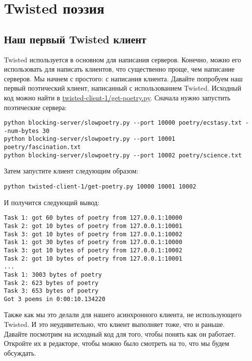 
\section{Twisted поэзия\label{sec:part4}}

\subsection{Наш первый Twisted клиент}

Twisted используется в основном для написания серверов. 
Конечно, можно его использовать для написать клиентов, 
что существенно проще, чем написание серверов. Мы начнем с 
простого: с написания клиента. 
Давайте попробуем наш первый поэтический клиент, 
написанный с использованием Twisted. Исходный код  
можно найти в 
\href{http://github.com/jdavisp3/twisted-intro/blob/master/twisted-client-1/get-poetry.py}{twisted-client-1/get-poetry.py}. Сначала нужно запустить поэтические сервера:

 \begin{verbatim}
python blocking-server/slowpoetry.py --port 10000 poetry/ecstasy.txt --num-bytes 30
python blocking-server/slowpoetry.py --port 10001 poetry/fascination.txt
python blocking-server/slowpoetry.py --port 10002 poetry/science.txt
\end{verbatim} 

Затем запустите клиент следующим образом:

 \begin{verbatim}
python twisted-client-1/get-poetry.py 10000 10001 10002
\end{verbatim} 

И получится следующий вывод:

 \begin{verbatim}
Task 1: got 60 bytes of poetry from 127.0.0.1:10000
Task 2: got 10 bytes of poetry from 127.0.0.1:10001
Task 3: got 10 bytes of poetry from 127.0.0.1:10002
Task 1: got 30 bytes of poetry from 127.0.0.1:10000
Task 3: got 10 bytes of poetry from 127.0.0.1:10002
Task 2: got 10 bytes of poetry from 127.0.0.1:10001
...
Task 1: 3003 bytes of poetry
Task 2: 623 bytes of poetry
Task 3: 653 bytes of poetry
Got 3 poems in 0:00:10.134220
\end{verbatim} 

Также как мы это делали для нашего асинхронного клиента, 
не использующего Twisted. И это неудивительно, что клиент 
выполняет тоже, что и раньше. Давайте посмотрим на исходный код 
для того, чтобы понять как он работает. Откройте их в редакторе, чтобы можно было 
смотреть на то, что мы будем обсуждать.



